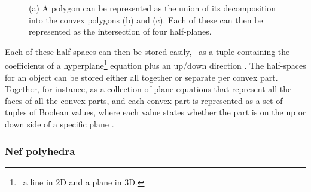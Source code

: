 \begin{figure}[b]
{\label{subfig:halfspace-intersection}}
\caption[A polygon represented as the union of two convex polygons]{(a) A polygon can be represented as the union of its decomposition into the convex polygons (b) and (c). Each of these can then be represented as the intersection of four half-planes.}
\label{fig:halfspace}
\end{figure}

Each of these half-spaces can then be stored easily, \eg\ as a tuple containing the coefficients of a hyperplane\footnote{\ie\ a line in 2D and a plane in 3D.} equation plus an up/down direction \citep{Naylor90,Thompson07}.
The half-spaces for an object can be stored either all together or separate per convex part.
Together, for instance, as a collection of plane equations that represent all the faces of all the convex parts, and each convex part is represented as a set of tuples of Boolean values, where each value states whether the part is on the up or down side of a specific plane \citep{Tammik07}.

\subsubsection{Nef polyhedra}

